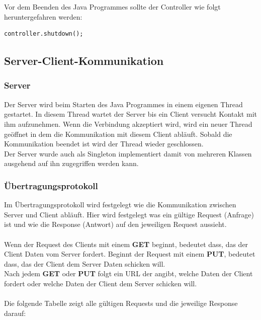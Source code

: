 Vor dem Beenden des Java Programmes sollte der Controller wie folgt heruntergefahren werden:
\begin{lstlisting}[style=JavaStyle, caption=Controller herunterfahren]
	controller.shutdown();
\end{lstlisting}

\newpage

\subsection{Server-Client-Kommunikation}
\subsubsection{Server}
Der Server wird beim Starten des Java Programmes in einem eigenen Thread gestartet. In diesem Thread wartet der Server bis ein Client versucht Kontakt mit ihm aufzunehmen. Wenn die Verbindung akzeptiert wird, wird ein neuer Thread geöffnet in dem die Kommunikation mit diesem Client abläuft. Sobald die Kommunikation beendet ist wird der Thread wieder geschlossen. 
\\ Der Server wurde auch als Singleton implementiert damit von mehreren Klassen ausgehend auf ihn zugegriffen werden kann.

\subsubsection{Übertragungsprotokoll}
Im Übertragungsprotokoll wird festgelegt wie die Kommunikation zwischen Server und Client abläuft. Hier wird festgelegt was ein gültige Request (Anfrage) ist und wie die Response (Antwort) auf den jeweiligen Request aussieht. 
\\ \\
Wenn der Request des Clients mit einem \textbf{GET} beginnt, bedeutet dass, das der Client Daten vom Server fordert. Beginnt der Request mit einem \textbf{PUT}, bedeutet dass, das der Client dem Server Daten schicken will.
\\ Nach jedem \textbf{GET} oder \textbf{PUT} folgt ein URL der angibt, welche Daten der Client fordert oder welche Daten der Client dem Server schicken will.
\\ \\
Die folgende Tabelle zeigt alle gültigen Requests und die jeweilige Response darauf:

